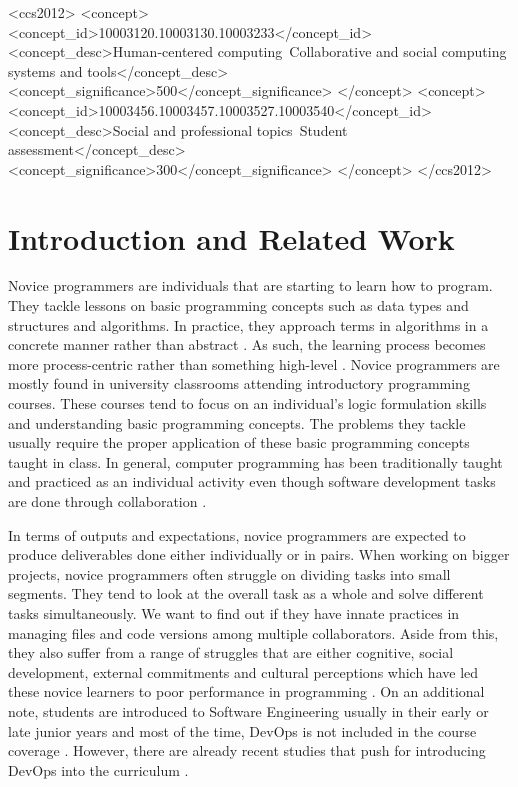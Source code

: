 \documentclass{sigchi}
\def\plainkeywords{devops; novice programmers; programmer support}
\begin{document}
\begin{CCSXML}
<ccs2012>
   <concept>
       <concept_id>10003120.10003130.10003233</concept_id>
       <concept_desc>Human-centered computing~Collaborative and social computing systems and tools</concept_desc>
       <concept_significance>500</concept_significance>
       </concept>
   <concept>
       <concept_id>10003456.10003457.10003527.10003540</concept_id>
       <concept_desc>Social and professional topics~Student assessment</concept_desc>
       <concept_significance>300</concept_significance>
       </concept>
 </ccs2012>
\end{CCSXML}
\keywords{\plainkeywords}
\printccsdesc
\section{Introduction and Related Work}
Novice programmers are individuals that are starting to learn how to program. They tackle lessons on basic programming concepts such as data types and structures and algorithms. In practice, they approach terms in algorithms in a concrete manner rather than abstract \cite{mccarthygame}. As such, the learning process becomes more process-centric rather than something high-level \cite{teague2014longitudinal}. Novice programmers are mostly found in university classrooms attending introductory programming courses. These courses tend to focus on an individual's logic formulation skills and understanding basic programming concepts. The problems they tackle usually require the proper application of these basic programming concepts taught in class. In general, computer programming has been traditionally taught and practiced as an individual activity even though software development tasks are done through collaboration \cite{mcdowell2002effects}. 

In terms of outputs and expectations, novice programmers are expected to produce deliverables done either individually or in pairs. When working on bigger projects, novice programmers often struggle on dividing tasks into small segments. They tend to look at the overall task as a whole and solve different tasks simultaneously. We want to find out if they have innate practices in managing files and code versions among multiple collaborators. Aside from this, they also suffer from a range of struggles that are either cognitive, social development, external commitments and cultural perceptions which have led these novice learners to poor performance in programming \cite{teague2008collaborative}. On an additional note, students are introduced to Software Engineering usually in their early or late junior years and most of the time, DevOps is not included in the course coverage \cite{bass2016software}. However, there are already recent studies that push for introducing DevOps into the curriculum \cite{bruel2019software, jones2018proposal}.
\end{document}
